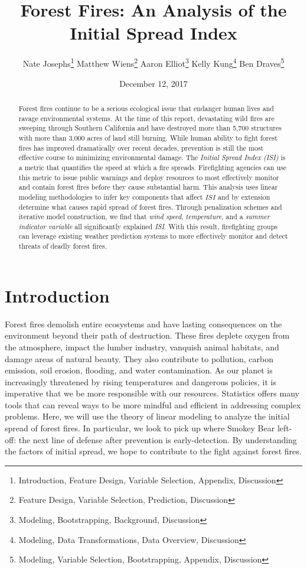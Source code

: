 \documentclass{article}
\begin{document}
\title{Forest Fires: An Analysis of the Initial Spread Index}
\author{Nate Josephs\footnote{Introduction, Feature Design, Variable Selection, Appendix, Discussion} Matthew Wiens\footnote{Feature Design, Variable Selection, Prediction, Discussion} Aaron Elliot\footnote{Modeling, Bootstrapping, Background, Discussion} Kelly Kung\footnote{Modeling, Data Transformations, Data Overview, Discussion} Ben Draves\footnote{Modeling, Variable Selection, Bootstrapping, Appendix, Discussion}}
\date{December 12, 2017}
\maketitle
\begin{abstract}
Forest fires continue to be a serious ecological issue that endanger human lives and ravage environmental systems. At the time of this report, devastating wild fires are sweeping through Southern California and have destroyed more than 5,700 structures with more than 3,000 acres of land still burning. While human ability to fight forest fires has improved dramatically over recent decades, prevention is still the most effective course to minimizing environmental damage. The \textit{Initial Spread Index (ISI)} is a metric that quantifies the speed at which a fire spreads. Firefighting agencies can use this metric to issue public warnings and deploy resources to most effectively monitor and contain forest fires before they cause substantial harm. This analysis uses linear modeling methodologies to infer key components that affect $\textit{ISI}$ and by extension determine what causes rapid spread of forest fires. Through penalization schemes and iterative model construction, we find that \textit{wind speed}, \textit{temperature}, and a \textit{summer indicator variable} all significantly explained \textit{ISI}. With this result, firefighting groups can leverage existing weather prediction systems to more effectively monitor and detect threats of deadly forest fires.
\end{abstract}

\section{Introduction}
Forest fires demolish entire ecosystems and have lasting consequences on the environment beyond their path of destruction. These fires deplete oxygen from the atmosphere, impact the lumber industry, vanquish animal habitats, and damage areas of natural beauty. They also contribute to pollution, carbon emission, soil erosion, flooding, and water contamination. As our planet is increasingly threatened by rising temperatures and dangerous policies, it is imperative that we be more responsible with our resources. Statistics offers many tools that can reveal ways to be more mindful and efficient in addressing complex problems. Here, we will use the theory of linear modeling to analyze the initial spread of forest fires. In particular, we look to pick up where Smokey Bear left-off: the next line of defense after prevention is early-detection. By understanding the factors of initial spread, we hope to contribute to the fight against forest fires.
\end{document}
